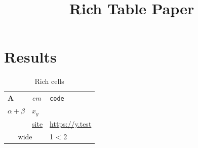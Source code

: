 \documentclass{article}
\title{Rich Table Paper}
\begin{document}
\maketitle
\section{Results}
\begin{table}
\caption{Rich cells}
\begin{tabular}{lll}
\textbf{A} & \emph{em} & \texttt{code} \\
$\alpha + \beta$ & $x_y$ & \cite{einstein} \\
\cite{a,b} & \href{https://x.test}{site} & \url{https://y.test} \\
\multicolumn{2}{c}{wide} & 1 < 2 \\
\end{tabular}
\end{table}

\end{document}

